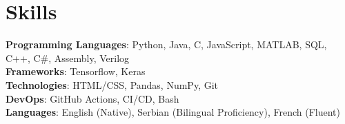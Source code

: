 \section{Skills}
    \begin{itemize}[leftmargin=0.15in, label={}]
	\small{\item{
		\textbf{Programming Languages}{: Python, Java, C, JavaScript, MATLAB, SQL, C++, C\#, Assembly, Verilog} \\
		\textbf{Frameworks}{: Tensorflow, Keras} \\
		\textbf{Technologies}{: HTML/CSS, Pandas, NumPy, Git} \\
		\textbf{DevOps}{: GitHub Actions, CI/CD, Bash} \\
		\textbf{Languages}{: English (Native), Serbian (Bilingual Proficiency), French (Fluent)} \\

	}}
    \end{itemize}
